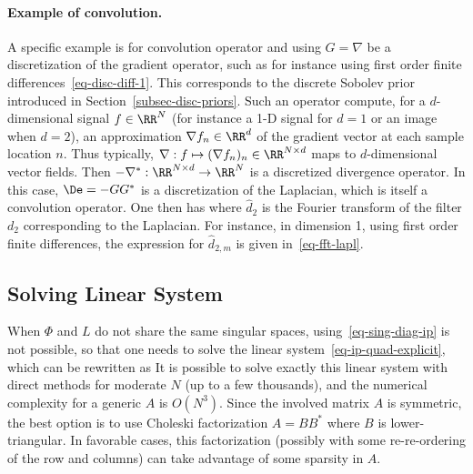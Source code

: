 \paragraph{Example of convolution.}

A specific example is for convolution operator 
and using $G=\nabla$ be a discretization of the gradient operator, such as for instance using first order finite differences~\eqref{eq-disc-diff-1}. This corresponds to the discrete Sobolev prior introduced in Section~\ref{subsec-disc-priors}.
%
Such an operator compute, for a $d$-dimensional signal $f \in \RR^N$ (for instance a 1-D signal for $d=1$ or an image when $d=2$), an approximation $\nabla f_n \in \RR^d$ of the gradient vector at each sample location $n$. Thus typically, $\nabla : f \mapsto (\nabla f_n)_n \in \RR^{N \times d}$ maps to $d$-dimensional vector fields.
%
Then $-\nabla^* : \RR^{N \times d} \rightarrow \RR^N$ is a discretized divergence operator.
%
In this case, $\De=-GG^*$ is a discretization of the Laplacian, which is itself a convolution operator. One then has
where $\hat d_2$ is the Fourier transform of the filter $d_2$ corresponding to the Laplacian. For instance, in dimension 1, using first order finite differences, the expression for $\hat d_{2,m}$ is given in~\eqref{eq-fft-lapl}.




\subsection{Solving Linear System}

When $\Phi$ and $L$ do not share the same singular spaces, using~\eqref{eq-sing-diag-ip} is not possible, so that one needs to solve the linear system~\eqref{eq-ip-quad-explicit}, which can be rewritten as
It is possible to solve exactly this linear system with direct methods for moderate $N$ (up to a few thousands), and the numerical complexity for a generic $A$ is $O(N^3)$. Since the involved matrix $A$ is symmetric, the best option is to use Choleski factorization $A=BB^*$ where $B$ is lower-triangular. In favorable cases, this factorization (possibly with some re-re-ordering of the row and columns) can take advantage of some sparsity in $A$.

